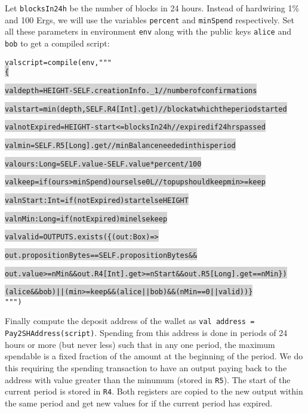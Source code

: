 \documentclass[11pt]{article}
\newcommand\Hi[2][lightgray]{%
	\hspace*{-\fboxsep}%
	\colorbox{#1}{#2}%
	\hspace*{-\fboxsep}%
}
\begin{document}
Let \texttt{blocksIn24h} be the number of blocks in 24 hours. Instead of hardwiring 1\% and 100 Ergs, we will use the variables \texttt{percent} and \texttt{minSpend} respectively. Set all these parameters in environment \texttt{env} along with the public keys \texttt{alice} and \texttt{bob} to get a compiled script:
\begin{alltt}
val script = compile(env, """ \Hi{\{}
  \Hi{val depth = HEIGHT - SELF.creationInfo._1 // number of confirmations}
  \Hi{val start = min(depth, SELF.R4[Int].get) // block at which the period started}
  \Hi{val notExpired = HEIGHT - start <= blocksIn24h // expired if 24 hrs passed}  
  \Hi{val min = SELF.R5[Long].get // min Balance needed in this period}

  \Hi{val ours:Long = SELF.value - SELF.value * percent / 100}
  \Hi{val keep = if (ours > minSpend) ours else 0L // topup should keep min >= keep}  
  \Hi{val nStart:Int = if (notExpired) start else HEIGHT}
  \Hi{val nMin:Long = if (notExpired) min else keep}
  
  \Hi{val valid = OUTPUTS.exists(\{(out:Box) =>}
    \Hi{out.propositionBytes == SELF.propositionBytes &&}
    \Hi{out.value >= nMin && out.R4[Int].get >= nStart && out.R5[Long].get == nMin\})}
    
  \Hi{(alice && bob) || (min >= keep && (alice || bob) && (nMin == 0 || valid))\}} """)

\end{alltt}
 
Finally compute the deposit address of the wallet as \texttt{val address = Pay2SHAddress(script)}. %
Spending from this address is done in periods of 24 hours or more (but never less) such that in any one period, the maximum spendable is a fixed fraction of the amount at the beginning of the period. We do this requiring the spending transaction to have an output paying back to the address with value greater than the minumum (stored in \texttt{R5}). The start of the current period is stored in \texttt{R4}. Both registers are copied to the new output within the same period and get new values for if the current period has expired.


%
%
\end{document}
